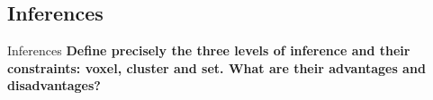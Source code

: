 \documentclass{beamer}
\begin{document}
% 
% 
% 


\subsection[Inferences]{Inferences}

\begin{frame}{Inferences}
  \textbf{Define precisely the three levels of inference and their constraints: voxel, cluster and set. What are their advantages and disadvantages?}

% 
\end{frame}
\end{document}

